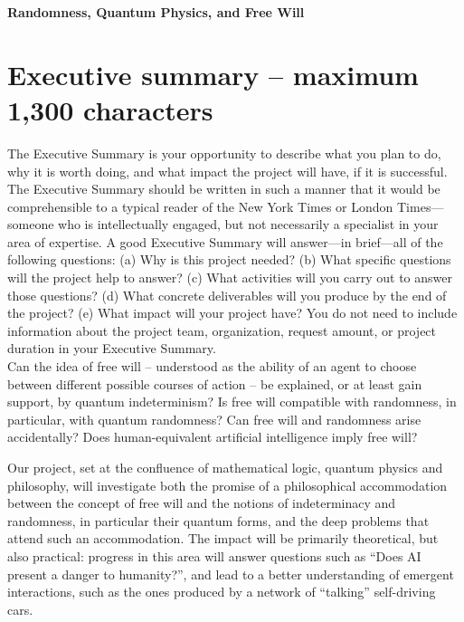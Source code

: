 \documentclass[11pt,  a4paper]{article}
\begin{document}
\thispagestyle{empty}
\begin{center}
{\Large \bf   Randomness, Quantum Physics, and Free Will}\end{center}

\section{Executive summary -- maximum 1,300 characters}
 {\small \color{blue}
 \small The Executive Summary is your opportunity to describe what you plan to do, why it is worth doing, and what impact the project will have, if it is successful. The Executive Summary should be written in such a manner that it would be comprehensible to a typical reader of the New York Times or London Times—someone who is intellectually engaged, but not necessarily a specialist in your area of expertise.
A good Executive Summary will answer—in brief—all of the following questions: (a) Why is this project needed? (b) What specific questions will the project help to answer? (c) What activities will you carry out to answer those questions? (d) What concrete deliverables will you produce by the end of the project? (e) What impact will your project have? You do not need to include information about the project team, organization, request amount, or project duration in your Executive Summary.}\\


 Can the idea of free will -- understood as the ability of an agent to choose between different possible courses of action -- be explained, or at least gain support, by quantum indeterminism?  Is free will compatible with randomness, in particular, with quantum randomness?  Can free will and randomness  arise  accidentally? Does human-equivalent artificial intelligence imply free will?



 Our  project, set at the confluence of mathematical logic, quantum physics and philosophy, will investigate both the promise of a philosophical accommodation
 between the concept of free will and the notions of  indeterminacy and randomness, in particular their quantum forms, and the deep problems that attend such an accommodation.  The impact will be primarily theoretical, but also practical:  progress in this area will answer  questions such as ``Does AI present a danger to humanity?'',  and lead to a better understanding of emergent interactions, such as the ones  produced by a network of ``talking'' self-driving  cars.
\\
\end{document}
